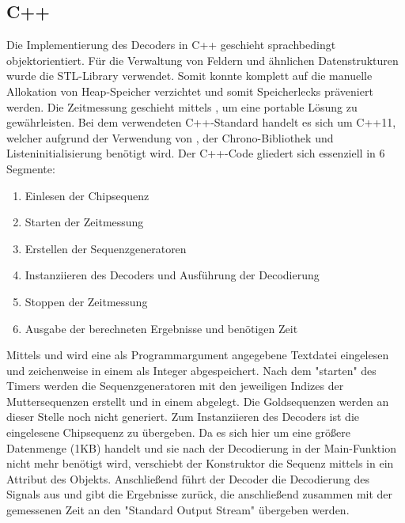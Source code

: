 \subsection{C++}
Die Implementierung des Decoders in C++ geschieht sprachbedingt objektorientiert. Für die Verwaltung von Feldern und ähnlichen Datenstrukturen wurde die STL-Library verwendet. Somit konnte komplett auf die manuelle Allokation von Heap-Speicher verzichtet und somit Speicherlecks präveniert werden. Die Zeitmessung geschieht mittels , um eine portable Lösung zu gewährleisten. Bei dem verwendeten C++-Standard handelt es sich um C++11, welcher aufgrund der Verwendung von , der Chrono-Bibliothek und Listeninitialisierung benötigt wird. Der C++-Code gliedert sich essenziell in 6 Segmente:
\begin{enumerate}
	\item Einlesen der Chipsequenz
	\item Starten der Zeitmessung
	\item Erstellen der Sequenzgeneratoren
	\item Instanziieren des Decoders und Ausführung der Decodierung
	\item Stoppen der Zeitmessung
	\item Ausgabe der berechneten Ergebnisse und benötigen Zeit
\end{enumerate}
Mittels  und  wird eine als Programmargument angegebene Textdatei eingelesen und zeichenweise in einem  als Integer abgespeichert.
Nach dem "starten" des Timers werden die Sequenzgeneratoren mit den jeweiligen Indizes der Muttersequenzen erstellt und in einem  abgelegt. Die Goldsequenzen werden an dieser Stelle noch nicht generiert.
Zum Instanziieren des Decoders ist die eingelesene Chipsequenz zu übergeben. Da es sich hier um eine größere Datenmenge (1KB) handelt und sie nach der Decodierung in der Main-Funktion nicht mehr benötigt wird, verschiebt der Konstruktor die Sequenz mittels  in ein Attribut des Objekts. Anschließend führt der Decoder die Decodierung des Signals aus und gibt die Ergebnisse zurück, die anschließend zusammen mit der gemessenen Zeit an den "Standard Output Stream" übergeben werden.

